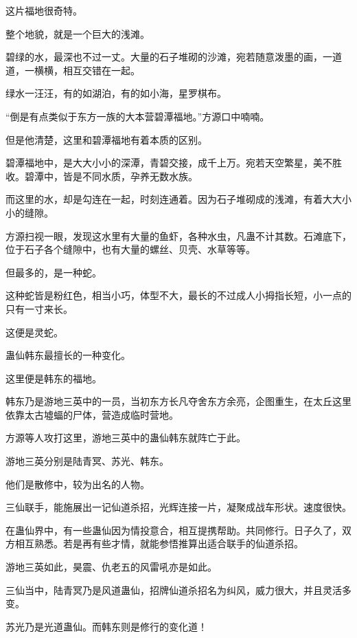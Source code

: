 
\begin{this_body}

这片福地很奇特。

整个地貌，就是一个巨大的浅滩。

碧绿的水，最深也不过一丈。大量的石子堆砌的沙滩，宛若随意泼墨的画，一道道，一横横，相互交错在一起。

绿水一汪汪，有的如湖泊，有的如小海，星罗棋布。

“倒是有点类似于东方一族的大本营碧潭福地。”方源口中喃喃。

但是他清楚，这里和碧潭福地有着本质的区别。

碧潭福地中，是大大小小的深潭，青碧交接，成千上万。宛若天空繁星，美不胜收。碧潭中，皆是不同水质，孕养无数水族。

而这里的水，却是勾连在一起，时刻连通着。因为石子堆砌成的浅滩，有着大大小小的缝隙。

方源扫视一眼，发现这水里有大量的鱼虾，各种水虫，凡蛊不计其数。石滩底下，位于石子各个缝隙中，也有大量的螺丝、贝壳、水草等等。

但最多的，是一种蛇。

这种蛇皆是粉红色，相当小巧，体型不大，最长的不过成人小拇指长短，小一点的只有一寸来长。

这便是灵蛇。

蛊仙韩东最擅长的一种变化。

这里便是韩东的福地。

韩东乃是游地三英中的一员，当初东方长凡夺舍东方余亮，企图重生，在太丘这里依靠太古墟蝠的尸体，营造成临时营地。

方源等人攻打这里，游地三英中的蛊仙韩东就阵亡于此。

游地三英分别是陆青冥、苏光、韩东。

他们是散修中，较为出名的人物。

三仙联手，能施展出一记仙道杀招，光辉连接一片，凝聚成战车形状。速度很快。

在蛊仙界中，有一些蛊仙因为情投意合，相互提携帮助。共同修行。日子久了，双方相互熟悉。若是再有些才情，就能参悟推算出适合联手的仙道杀招。

游地三英如此，昊震、仇老五的风雷吼亦是如此。

三仙当中，陆青冥乃是风道蛊仙，招牌仙道杀招名为纠风，威力很大，并且灵活多变。

苏光乃是光道蛊仙。而韩东则是修行的变化道！


\end{this_body}
